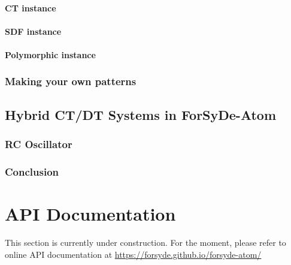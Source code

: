 \documentclass{book}
\newcommand*{\RootPath}{../../}%
\begin{document}
\begin{refsection}
\subsection{CT instance}
\label{sec:ct-instance}


\subsection{SDF instance}
\label{sec:sdf-instance}


\subsection{Polymorphic instance}
\label{sec:poly-instance}


\section{Making your own patterns}
\label{sec:making-your-own}


\label{sec:conclusion}


\printbibliography[heading=subbibliography]
\end{refsection}

\begin{refsection}
\chapter{Hybrid CT/DT Systems in {{\sc ForSyDe-Atom}}}
\label{ch:hybrid}
\renewcommand*{\RootPath}{../../hybrid/docs/latex}%
\graphicspath{{../../hybrid/docs/latex/figs/}}


\begin{summary}

\end{summary}
\minitoc



\section{RC Oscillator}
\label{sec:rc-oscillator}


\section{Conclusion}
\label{sec:conclusion}


\printbibliography[heading=subbibliography]
\end{refsection}

\part{API Documentation}
\label{part:api-documentation}

\begin{summary}
  This section is currently under construction. For the moment, please refer to online API documentation at \url{https://forsyde.github.io/forsyde-atom/}
\end{summary}
\end{document}
